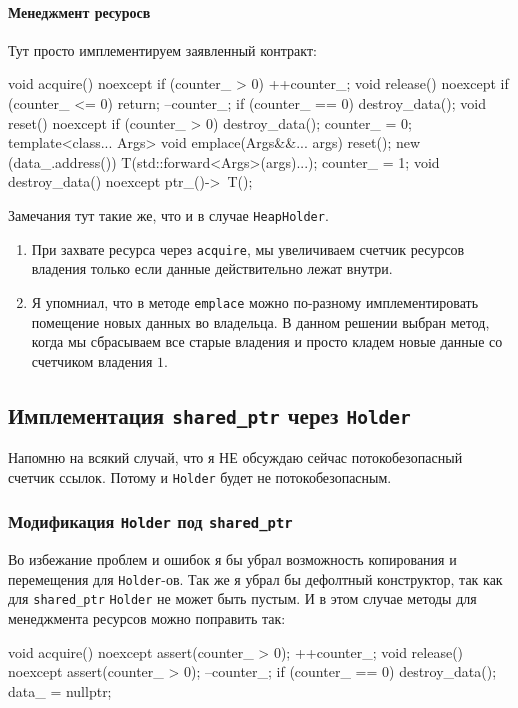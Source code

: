 \paragraph{Менеджмент ресуросв}

Тут просто имплементируем заявленный контракт:
\begin{cppcode}
void acquire() noexcept {
  if (counter_ > 0)
    ++counter_;
}
void release() noexcept {
  if (counter_ <= 0)
    return;
  --counter_;
  if (counter_ == 0)
    destroy_data();
}
void reset() noexcept {
  if (counter_ > 0) {
    destroy_data();
    counter_ = 0;
  }
}
template<class... Args>
void emplace(Args&&... args) {
  reset();
  new (data_.address()) T(std::forward<Args>(args)...);
  counter_ = 1;
}
void destroy_data() noexcept {
  ptr_()->~T();
}
\end{cppcode}
Замечания тут такие же, что и в случае \verb"HeapHolder".
\begin{enumerate}
\item При захвате ресурса через \verb"acquire", мы увеличиваем счетчик ресурсов владения только если данные действительно лежат внутри.

\item Я упомниал, что в методе \verb"emplace" можно по-разному имплементировать помещение новых данных во владельца.
В данном решении выбран метод, когда мы сбрасываем все старые владения и просто кладем новые данные со счетчиком владения $1$.
\end{enumerate}

\subsection{Имплементация \texttt{shared\_ptr} через \texttt{Holder}}

Напомню на всякий случай, что я НЕ обсуждаю сейчас потокобезопасный счетчик ссылок.
Потому и \verb"Holder" будет не потокобезопасным.

\subsubsection{Модификация \texttt{Holder} под \texttt{shared\_ptr}}

Во избежание проблем и ошибок я бы убрал возможность копирования и перемещения для \verb"Holder"-ов.
Так же я убрал бы дефолтный конструктор, так как для \verb"shared_ptr" \verb"Holder" не может быть пустым.
И в этом случае методы для менеджмента ресурсов можно поправить так:
\begin{cppcode}
void acquire() noexcept {
  assert(counter_ > 0);
  ++counter_;
}
void release() noexcept {
  assert(counter_ > 0);
  --counter_;
  if (counter_ == 0) {
    destroy_data();
    data_ = nullptr;
  }
}
\end{cppcode}

